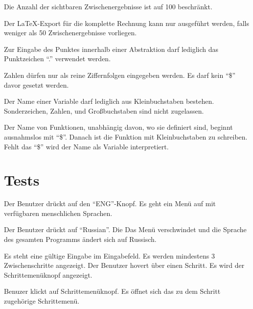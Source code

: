 \documentclass[parskip=full,11pt,twoside]{scrartcl}
\begin{document}
Die Anzahl der sichtbaren Zwischenergebnisse ist auf 100 beschränkt.

Der LaTeX-Export für die komplette Rechnung kann nur ausgeführt werden, falls weniger als 50 Zwischenergebnisse vorliegen.

Zur Eingabe des Punktes innerhalb einer Abstraktion darf lediglich das Punktzeichen \enquote {.} verwendet werden.

Zahlen dürfen nur als reine Ziffernfolgen eingegeben werden. Es darf kein \enquote {\$} davor gesetzt werden.

Der Name einer Variable darf lediglich aus Kleinbuchstaben bestehen. Sonderzeichen, Zahlen, und Großbuchstaben sind nicht zugelassen.

Der Name von Funktionen, unabhängig davon, wo sie definiert sind, beginnt ausnahmslos mit \enquote {\$}. Danach ist die Funktion mit Kleinbuchstaben zu schreiben. Fehlt das \enquote {\$} wird der Name als Variable interpretiert.


\newpage
\section{Tests}

{Der Benutzer drückt auf den \enquote{ENG}-Knopf.}
{Es geht ein Menü auf mit verfügbaren menschlichen Sprachen.}

{Der Benutzer drückt auf \enquote{Russian}.}
{Die Das Menü verschwindet und die Sprache des gesamten Programms ändert sich auf Russisch.}


\teststep
{Es steht eine gültige Eingabe im Eingabefeld.
Es werden mindestens 3 Zwischenschritte angezeigt.}
{Der Benutzer hovert über einen Schritt.}
{Es wird der Schrittemenüknopf angezeigt.}

{Benuzer klickt auf Schrittemenüknopf.}
{Es öffnet sich das zu dem Schritt zugehörige Schrittemenü.}
\end{document}
